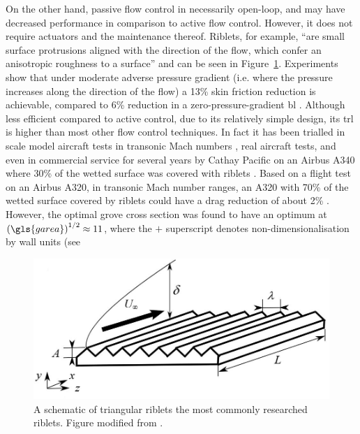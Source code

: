 On the other hand, passive flow control in necessarily open-loop, and may have decreased performance in comparison to active flow control. However, it does not require actuators and the maintenance thereof. Riblets, for example, ``are small surface protrusions aligned with the direction of the flow, which confer an anisotropic roughness to a surface'' \cite{garcia-mayoral2011} and can be seen in Figure~\ref{fig:riblets}. Experiments show that under moderate adverse pressure gradient (i.e. where the pressure increases along the direction of the flow) a 13\% skin friction reduction is achievable, compared to 6\% reduction in a zero-pressure-gradient \gls{bl} \cite{debisschop1996}. Although less efficient compared to active control, due to its relatively simple design, its \gls{trl} is higher than most other flow control techniques. In fact it has been trialled in scale model aircraft tests in transonic Mach numbers \cite{coustols1990}, real aircraft tests, and even in commercial service for several years by Cathay Pacific on an Airbus A340 where 30\% of the wetted surface was covered with riblets \cite{bechert2006}. Based on a flight test on an Airbus A320, in transonic Mach number ranges, an A320 with 70\% of the wetted surface covered by riblets could have a drag reduction of about 2\% \cite{szodruch1991}. However, the optimal grove cross section was found to have an optimum at $\left(\gls{garea}\right)^{1 /2}\approx11$, where the $+$ superscript denotes non-dimensionalisation by wall units (see %

\begin{figure}[htbp]
\centering
\includegraphics[width=0.5\linewidth]{introduction/fig/riblets.jpeg}
\caption{A schematic of triangular riblets the most commonly researched riblets. Figure modified from \cite{raayai-ardakani2019}.}
\label{fig:riblets}
\end{figure}

